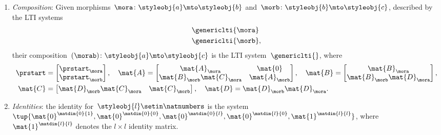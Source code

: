 \begin{ctdefinition}
\begin{enumerate}
        \item \emph{Composition}: Given morphisms~$\mora \colon \styleobj{a}\mto \styleobj{b}$ and~$\morb\colon \styleobj{b}\mto \styleobj{c}$, described by the LTI systems
              \begin{equation}
                  \begin{aligned}
                       & \genericlti{\mora} \\
                       & \genericlti{\morb},
                  \end{aligned}
              \end{equation}
              their composition~$(\morab)\colon \styleobj{a}\mto \styleobj{c}$ is the LTI system~$\genericlti{}$, where
              \begin{equation}
                  \begin{aligned}
                      \prstart & =\begin{bmatrix}
                                      \prstart_\mora \\
                                      \prstart_\morb \\
                                  \end{bmatrix},\quad
                      \mat{A}=\begin{bmatrix}
                                  \mat{A}_\mora              & \mat{0}       \\
                                  \mat{B}_\morb\mat{C}_\mora & \mat{A}_\morb
                              \end{bmatrix},\quad
                      \mat{B}=\begin{bmatrix}
                                  \mat{B}_\mora \\
                                  \mat{B}_\morb\mat{D}_\mora
                              \end{bmatrix}, \\
                      \mat{C}  & =\begin{bmatrix}
                                      \mat{D}_\morb\mat{C}_\mora & \mat{C}_\morb
                                  \end{bmatrix}, \quad
                      \mat{D}=\mat{D}_\morb\mat{D}_\mora.
                  \end{aligned}
              \end{equation}
        \item \emph{Identities}: the identity for~$\styleobj{l}\setin \natnumbers$ is the system~$\tup{\mat{0}^{\matdim{0}{1}},\mat{0}^{\matdim{0}{0}},\mat{0}^{\matdim{0}{l}},\mat{0}^{\matdim{l}{0}},\mat{1}^{\matdim{l}{l}}}$, where $\mat{1}^{\matdim{l}{l}}$ denotes the $l\times l$ identity matrix. 
    \end{enumerate}
\end{ctdefinition}


